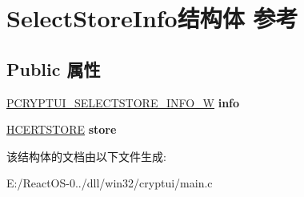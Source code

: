 \hypertarget{struct_select_store_info}{}\section{Select\+Store\+Info结构体 参考}
\label{struct_select_store_info}
\subsection*{Public 属性}
\begin{DoxyCompactItemize}
\item 
\mbox{\label{struct_select_store_info_a223a216f53424d554c51df06a25b8dcd}} 
\hyperlink{struct___c_r_y_p_t_u_i___s_e_l_e_c_t_s_t_o_r_e___i_n_f_o___w}{P\+C\+R\+Y\+P\+T\+U\+I\+\_\+\+S\+E\+L\+E\+C\+T\+S\+T\+O\+R\+E\+\_\+\+I\+N\+F\+O\+\_\+W} {\bfseries info}
\item 
\mbox{\label{struct_select_store_info_a84468202fb4bde749ab54e725c417409}} 
\hyperlink{interfacevoid}{H\+C\+E\+R\+T\+S\+T\+O\+RE} {\bfseries store}
\end{DoxyCompactItemize}


该结构体的文档由以下文件生成\+:\begin{DoxyCompactItemize}
\item 
E\+:/\+React\+O\+S-\/0../dll/win32/cryptui/main.\+c\end{DoxyCompactItemize}

